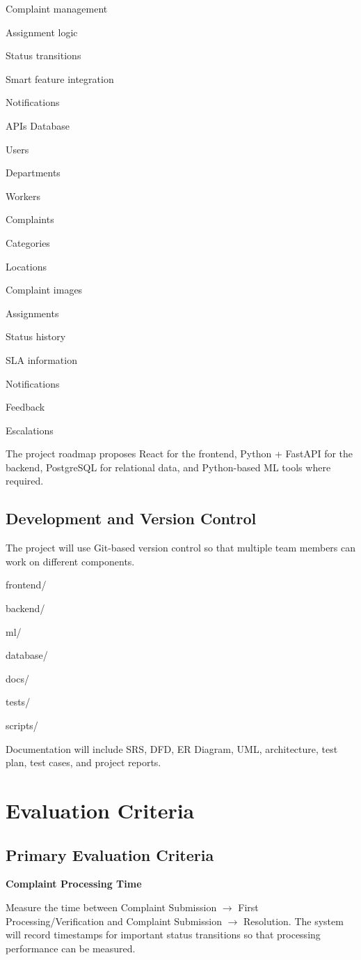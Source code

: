 \documentclass[12pt,a4paper]{article}
\begin{document}
Complaint management

Assignment logic

Status transitions

Smart feature integration

Notifications

APIs Database

Users

Departments

Workers

Complaints

Categories

Locations

Complaint images

Assignments

Status history

SLA information

Notifications

Feedback

Escalations

The project roadmap proposes React for the frontend, Python + FastAPI for the backend, PostgreSQL for relational data, and Python-based ML tools where required.

\subsection{Development and Version Control}
The project will use Git-based version control so that multiple team members can work on different components.

frontend/

backend/

ml/

database/

docs/

tests/

scripts/

Documentation will include SRS, DFD, ER Diagram, UML, architecture, test plan, test cases, and project reports.

\section{Evaluation Criteria}
\subsection{Primary Evaluation Criteria}
\textbf{Complaint Processing Time}\par
Measure the time between Complaint Submission $\rightarrow$ First Processing/Verification and Complaint Submission $\rightarrow$ Resolution. The system will record timestamps for important status transitions so that processing performance can be measured.
\end{document}
